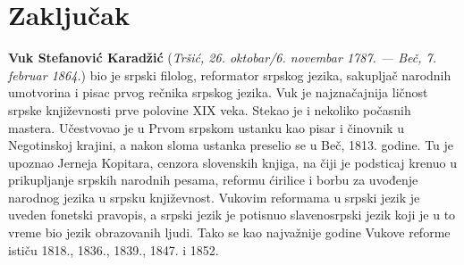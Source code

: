 \documentclass[12pt,oneside]{memoir}
\begin{document}
\chapter{Zaključak}


\literatura

\backmatter

\begin{biografija}
  \textbf{Vuk Stefanović Karadžić} (\emph{Tršić,
    26. oktobar/6. novembar 1787. — Beč, 7. februar 1864.}) bio je
  srpski filolog, reformator srpskog jezika, sakupljač narodnih
  umotvorina i pisac prvog rečnika srpskog jezika.  Vuk je
  najznačajnija ličnost srpske književnosti prve polovine XIX
  veka. Stekao je i nekoliko počasnih mastera.  Učestvovao je u
  Prvom srpskom ustanku kao pisar i činovnik u Negotinskoj krajini, a
  nakon sloma ustanka preselio se u Beč, 1813. godine. Tu je upoznao
  Jerneja Kopitara, cenzora slovenskih knjiga, na čiji je podsticaj
  krenuo u prikupljanje srpskih narodnih pesama, reformu ćirilice i
  borbu za uvođenje narodnog jezika u srpsku književnost. Vukovim
  reformama u srpski jezik je uveden fonetski pravopis, a srpski jezik
  je potisnuo slavenosrpski jezik koji je u to vreme bio jezik
  obrazovanih ljudi. Tako se kao najvažnije godine Vukove reforme
  ističu 1818., 1836., 1839., 1847. i 1852.
\end{biografija}
\end{document}
